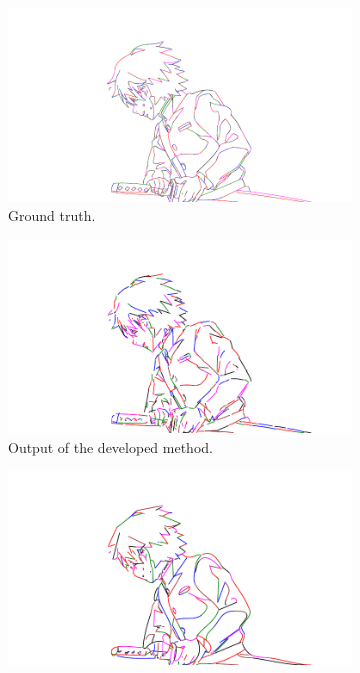 \begin{figure}[h]
    \centering
    \begin{subfigure}{.49\textwidth}
    \includegraphics[width=\textwidth,trim={6em 6em 12em 4em},clip]{graphics/outputs/ground-truth/order/tonari-full_42.pdf}
    \caption{Ground truth.}
    \label{fig:tonari-full_42_full.order.zoom.gt}
    \end{subfigure}
    \begin{subfigure}{.49\textwidth}
    \includegraphics[width=\textwidth,trim={6em 6em 12em 4em},clip]{graphics/outputs/marked/order/tonari-full_42.pdf}
    \caption{Output of the developed method.}
    \end{subfigure}
    \begin{subfigure}{.49\textwidth}
    \includegraphics[width=\textwidth,trim={6em 6em 12em 4em},clip]{graphics/outputs/autotrace/order/tonari-full_42.pdf}

\end{subfigure}
\end{figure}
